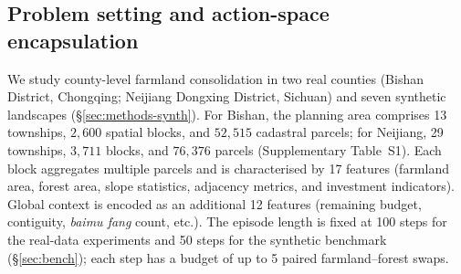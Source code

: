 \documentclass[11pt]{article}
\begin{document}
\subsection{Problem setting and action-space encapsulation}\label{sec:methods-action}

We study county-level farmland consolidation in two real counties (Bishan District, Chongqing; Neijiang Dongxing District, Sichuan) and seven synthetic landscapes (\S\ref{sec:methods-synth}). For Bishan, the planning area comprises 13 townships, $2{,}600$ spatial blocks, and $52{,}515$ cadastral parcels; for Neijiang, 29 townships, $3{,}711$ blocks, and $76{,}376$ parcels (Supplementary Table~S1). Each block aggregates multiple parcels and is characterised by 17 features (farmland area, forest area, slope statistics, adjacency metrics, and investment indicators). Global context is encoded as an additional 12 features (remaining budget, contiguity, \textit{baimu fang} count, etc.). The episode length is fixed at 100 steps for the real-data experiments and 50 steps for the synthetic benchmark (\S\ref{sec:bench}); each step has a budget of up to 5 paired farmland--forest swaps.
\end{document}
